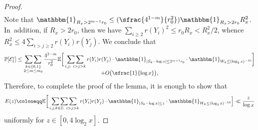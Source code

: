 \documentclass[10pt]{amsart}
\newcommand{\Psfrac}[2]{(\sfrac{#1}{#2})}
\newcommand{\ZZ}{\mathbb{Z}}
\newcommand{\PP}{\mathbb{P}}
\newcommand{\EE}{\mathbb{E}}
\newcommand{\one}{\mathbbm{1}}
\newcommand{\EC}{\mathcal{E}}
\newcommand{\bg}{\big}
\newcommand{\bgg}{\Big}
\newcommand{\bggg}{\bigg}
\theoremstyle{plain}
\theoremstyle{definition}
\begin{document}
\begin{proof}
\begin{multline*}
\end{multline*}
Note that $\one_{R_x > 2^{m-1}r_0}\le \Psfrac{4^{1-m}}{r_0^2} \one_{R_x>2r_0}R_x^2$. In~addition, if $R_x>2r_0$, then we have $\sum_{i\ge2}r(Y_i)^2\le r_0R_x<R_x^2/2$, whence $R_x^2\le 4\sum_{i>j\ge2}r(Y_i)r(Y_j)$.
We conclude that
\begin{multline*}
\PP[\EC_1^c]\le \mathop{\sum\sum}_{\substack{k\in\{0,1\} \\ 2\le m\le m_0} }
\frac{4^{2-m}}{r_0^2} \EE\bggg[ \mathop{\sum\sum}_{i,j :\ i>j>k}r(Y_i)r(Y_j) \cdot \one_{|S_k-\log x|\le 2^{m+1}r_0} \cdot \one_{W_k \le (\log_2x)^{-10}} \bggg] \\[-10pt]
+O\bg(\sfrac{1}{\log x}\bg),
\end{multline*}
Therefore, to complete the proof of the lemma, it is enough to show that
\begin{equation}
\label{eq:E(z)}
E(z) \coloneqq \EE \bggg[\mathop{\sum\sum\sum}_{\substack{i, j, k \in \ZZ:\ i>j>k}}r(Y_i)r(Y_j) \cdot \one_{|S_k-\log x|\le z} \cdot \one_{W_k \le (\log_2x)^{-10}} \bgg] \ll \frac{z}{\log x}
\end{equation}
uniformly for $z\in[0,4\log_2x]$.


\end{proof}
\end{document}
